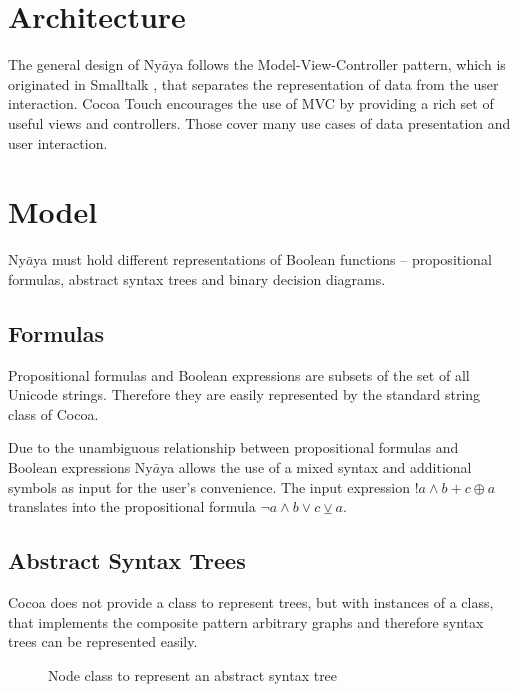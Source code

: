 
\section{Architecture}

The general design of Ny$\bar{a}$ya follows the Model-View-Controller pattern,
which is originated in Smalltalk \cite[p.4]{GAMMAETAL}, 
that separates the representation of data from the user interaction.
Cocoa Touch  encourages the use of MVC by providing a rich set of useful views and controllers.
Those cover many use cases of data presentation and user interaction.

\section{Model}

Ny$\bar{a}$ya must hold different representations of Boolean functions – propositional formulas, abstract syntax trees and binary decision diagrams. 

\subsection{Formulas}
Propositional formulas and Boolean expressions are subsets of the set of all Unicode strings. 
Therefore they are easily represented by the standard string class of Cocoa. 

Due to the unambiguous relationship between propositional formulas and Boolean expressions 
Ny$\bar{a}$ya allows the use of a mixed syntax and additional symbols as input
for the user's convenience. The input expression $!a \wedge b + c \oplus a$ translates into the propositional formula
$\neg a \wedge b \vee c \veebar a$.

\subsection{Abstract Syntax Trees}

Cocoa does not provide a class to represent trees, 
but with instances of a class, 
that implements the composite pattern \cite[p.163ff]{GAMMAETAL}
arbitrary graphs and therefore syntax trees can be represented easily.

\begin{figure}[htbp]
\begin{center}
\caption{Node class to represent an abstract syntax tree}
\label{fig:NyayaNodeCluster}
\end{center}
\end{figure}

